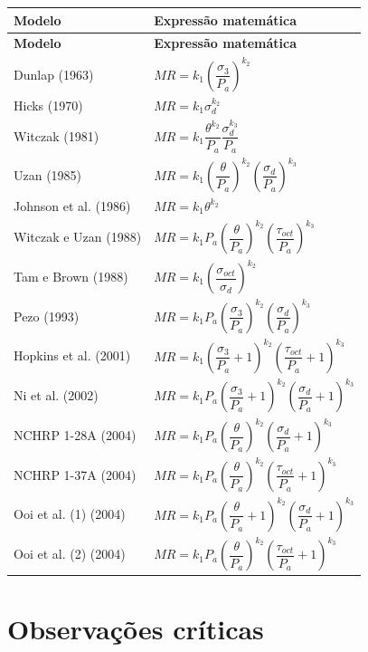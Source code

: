 \documentclass[12pt,a4paper]{article}
\begin{document}
\renewcommand{\arraystretch}{1.35}
\begin{longtable}{p{4.3cm}p{10cm}}
\toprule
\textbf{Modelo} & \textbf{Expressão matemática} \\
\midrule
\endfirsthead
\toprule
\textbf{Modelo} & \textbf{Expressão matemática} \\
\midrule
\endhead
Dunlap (1963) & $MR=k_1\left(\dfrac{\sigma_3}{P_a}\right)^{k_2}$ \\
Hicks (1970) & $MR=k_1\sigma_d^{k_2}$ \\
Witczak (1981) & $MR=k_1\dfrac{\theta^{k_2}}{P_a}\dfrac{\sigma_d^{k_3}}{P_a}$ \\
Uzan (1985) & $MR=k_1\left(\dfrac{\theta}{P_a}\right)^{k_2}\left(\dfrac{\sigma_d}{P_a}\right)^{k_3}$ \\
Johnson et al. (1986) & $MR=k_1\theta^{k_2}$ \\
Witczak e Uzan (1988) & $MR=k_1P_a\left(\dfrac{\theta}{P_a}\right)^{k_2}\left(\dfrac{\tau_{oct}}{P_a}\right)^{k_3}$ \\
Tam e Brown (1988) & $MR=k_1\left(\dfrac{\sigma_{oct}}{\sigma_d}\right)^{k_2}$ \\
Pezo (1993) & $MR=k_1P_a\left(\dfrac{\sigma_3}{P_a}\right)^{k_2}\left(\dfrac{\sigma_d}{P_a}\right)^{k_3}$ \\
Hopkins et al. (2001) & $MR=k_1\left(\dfrac{\sigma_3}{P_a}+1\right)^{k_2}\left(\dfrac{\tau_{oct}}{P_a}+1\right)^{k_3}$ \\
Ni et al. (2002) & $MR=k_1P_a\left(\dfrac{\sigma_3}{P_a}+1\right)^{k_2}\left(\dfrac{\sigma_d}{P_a}+1\right)^{k_3}$ \\
NCHRP 1-28A (2004) & $MR=k_1P_a\left(\dfrac{\theta}{P_a}\right)^{k_2}\left(\dfrac{\sigma_d}{P_a}+1\right)^{k_3}$ \\
NCHRP 1-37A (2004) & $MR=k_1P_a\left(\dfrac{\theta}{P_a}\right)^{k_2}\left(\dfrac{\tau_{oct}}{P_a}+1\right)^{k_3}$ \\
Ooi et al. (1) (2004) & $MR=k_1P_a\left(\dfrac{\theta}{P_a}+1\right)^{k_2}\left(\dfrac{\sigma_d}{P_a}+1\right)^{k_3}$ \\
Ooi et al. (2) (2004) & $MR=k_1P_a\left(\dfrac{\theta}{P_a}\right)^{k_2}\left(\dfrac{\tau_{oct}}{P_a}+1\right)^{k_3}$ \\
\bottomrule
\end{longtable}

\section*{Observações críticas}
\end{document}
